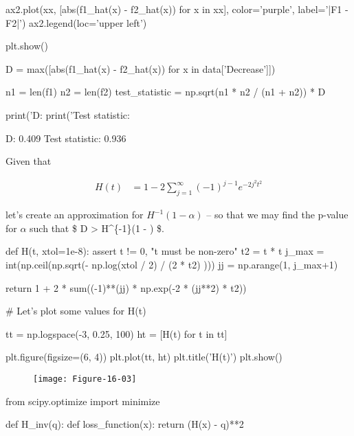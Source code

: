 {\begin{python}
ax2.plot(xx, [abs(f1_hat(x) - f2_hat(x)) for x in xx], color='purple', label='|F1 - F2|')
ax2.legend(loc='upper left')

plt.show()
\end{python}

\begin{python}
D = max([abs(f1_hat(x) - f2_hat(x)) for x in data['Decrease']])

n1 = len(f1)
n2 = len(f2)
test_statistic = np.sqrt(n1 * n2 / (n1 + n2)) * D

print('D: %
print('Test statistic: %
\end{python}

\begin{console}
D: 0.409
Test statistic: 0.936
\end{console}

Given that

\begin{align}
H(t) &= 1 - 2 \sum_{j=1}^\infty (-1)^{j-1} e^{-2j^2t^2}
\end{align}

let's create an approximation for \(H^{-1}(1 - \alpha)\) -- so that we
may find the p-value for \(\alpha\) such that \$
 D \textgreater{} H\^{}\{-1\}(1 -
\alpha) \$.

\begin{python}
def H(t, xtol=1e-8):
    assert t != 0, "t must be non-zero"
    t2 = t * t
    j_max = int(np.ceil(np.sqrt(- np.log(xtol / 2) / (2 * t2) )))
    jj = np.arange(1, j_max+1)

    return 1 + 2 * sum((-1)**(jj) * np.exp(-2 * (jj**2) * t2))
\end{python}

\begin{python}
# Let's plot some values for H(t)

tt = np.logspace(-3, 0.25, 100)
ht = [H(t) for t in tt]

plt.figure(figsize=(6, 4))
plt.plot(tt, ht)
plt.title('H(t)')
plt.show()
\end{python}

\begin{figure}[H]
\texttt{[image: Figure-16-03]}
\end{figure}

\begin{python}
from scipy.optimize import minimize

def H_inv(q):
    def loss_function(x):
        return (H(x) - q)**2
    

\end{python}}
